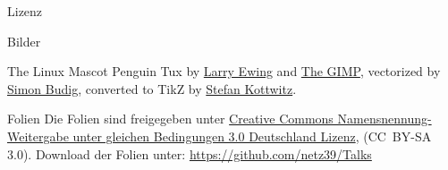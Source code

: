 \documentclass{beamer}
\begin{document}
\begin{frame}{Lizenz}
    \begin{block}{Bilder}
        \begin{block}{The Linux Mascot}
            Penguin Tux by \href{mailto:lewing@isc.tamu.edu}{Larry Ewing}
            and \href{http://isc.tamu.edu/~lewing/linux/}{The GIMP},
            vectorized by
            \href{http://www.home.unix-ag.org/simon/}{Simon Budig},
            converted to TikZ by
            \href{http://www.texample.net/weblog/2012/apr/28/tux-tex-tikz/}{Stefan Kottwitz}.
        \end{block}
    \end{block}
    \begin{block}{Folien}
        Die Folien sind freigegeben unter
        \href{http://creativecommons.org/licenses/by-sa/3.0/de/}{Creative
        Commons Namensnennung-Weitergabe unter gleichen Bedingungen 3.0
        Deutschland Lizenz}, (CC\ BY-SA 3.0). Download der Folien unter:
        \url{https://github.com/netz39/Talks}
    \end{block}
\end{frame}
\end{document}
